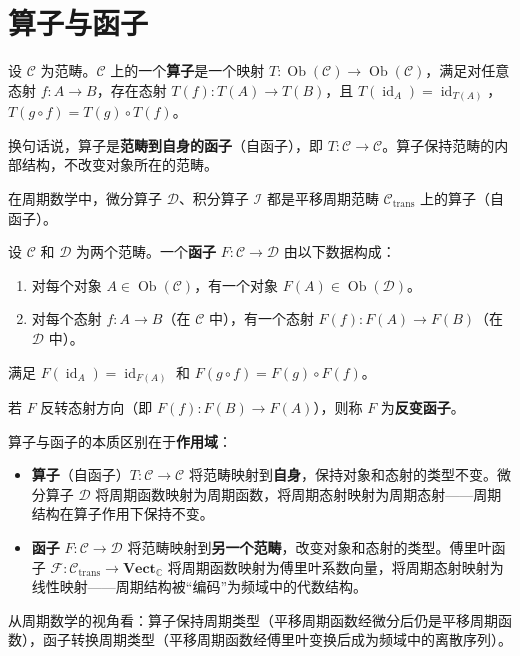 \section{算子与函子}\label{sec:operator_vs_functor}

\begin{definition}[算子]\label{def:operator}
设 $\mathcal{C}$ 为范畴。$\mathcal{C}$ 上的一个\textbf{算子}是一个映射 $T: \operatorname{Ob}(\mathcal{C}) \to \operatorname{Ob}(\mathcal{C})$，满足对任意态射 $f: A \to B$，存在态射 $T(f): T(A) \to T(B)$，且 $T(\operatorname{id}_A) = \operatorname{id}_{T(A)}$，$T(g \circ f) = T(g) \circ T(f)$。

换句话说，算子是\textbf{范畴到自身的函子}（自函子），即 $T: \mathcal{C} \to \mathcal{C}$。算子保持范畴的内部结构，不改变对象所在的范畴。

在周期数学中，微分算子 $\mathcal{D}$、积分算子 $\mathcal{I}$ 都是平移周期范畴 $\mathcal{C}_{\text{trans}}$ 上的算子（自函子）。
\end{definition}

\begin{definition}[函子]\label{def:functor}
设 $\mathcal{C}$ 和 $\mathcal{D}$ 为两个范畴。一个\textbf{函子} $F: \mathcal{C} \to \mathcal{D}$ 由以下数据构成：
\begin{enumerate}[label=(\roman*)]
    \item 对每个对象 $A \in \operatorname{Ob}(\mathcal{C})$，有一个对象 $F(A) \in \operatorname{Ob}(\mathcal{D})$。
    \item 对每个态射 $f: A \to B$（在 $\mathcal{C}$ 中），有一个态射 $F(f): F(A) \to F(B)$（在 $\mathcal{D}$ 中）。
\end{enumerate}
满足 $F(\operatorname{id}_A) = \operatorname{id}_{F(A)}$ 和 $F(g \circ f) = F(g) \circ F(f)$。

若 $F$ 反转态射方向（即 $F(f): F(B) \to F(A)$），则称 $F$ 为\textbf{反变函子}。
\end{definition}

\begin{remark}[算子与函子的区别]\label{rem:operator_vs_functor}
算子与函子的本质区别在于\textbf{作用域}：
\begin{itemize}
    \item \textbf{算子}（自函子）$T: \mathcal{C} \to \mathcal{C}$ 将范畴映射到\textbf{自身}，保持对象和态射的类型不变。微分算子 $\mathcal{D}$ 将周期函数映射为周期函数，将周期态射映射为周期态射——周期结构在算子作用下保持不变。
    \item \textbf{函子} $F: \mathcal{C} \to \mathcal{D}$ 将范畴映射到\textbf{另一个范畴}，改变对象和态射的类型。傅里叶函子 $\mathcal{F}: \mathcal{C}_{\text{trans}} \to \mathbf{Vect}_{\mathbb{C}}$ 将周期函数映射为傅里叶系数向量，将周期态射映射为线性映射——周期结构被“编码”为频域中的代数结构。
\end{itemize}
从周期数学的视角看：算子保持周期类型（平移周期函数经微分后仍是平移周期函数），函子转换周期类型（平移周期函数经傅里叶变换后成为频域中的离散序列）。
\end{remark}

